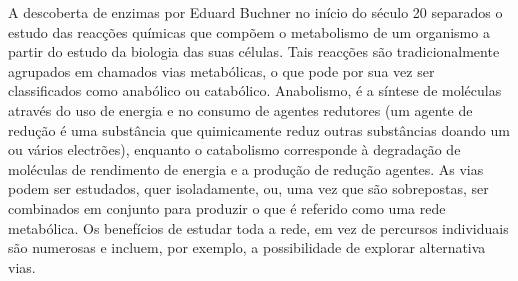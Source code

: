 \indent A descoberta de enzimas por Eduard Buchner no início do século 20 separados o estudo das reacções químicas que compõem o metabolismo de um organismo a partir do estudo da biologia das suas células. Tais reacções são tradicionalmente agrupados em chamados vias metabólicas, o que pode por sua vez ser classificados como anabólico ou catabólico. Anabolismo, é a síntese de moléculas através do uso de energia e no consumo de agentes redutores (um agente de redução é uma substância que quimicamente reduz outras substâncias doando um ou vários electrões), enquanto o catabolismo corresponde à degradação de moléculas de rendimento de energia e a produção de redução agentes. As vias podem ser estudados, quer isoladamente, ou, uma vez que são sobrepostas, ser combinados em conjunto para produzir o que é referido como uma rede metabólica. Os benefícios de estudar toda a rede, em vez de percursos individuais são numerosas e incluem, por exemplo, a possibilidade de explorar alternativa vias. \\



\cite{lacroixCTS08}